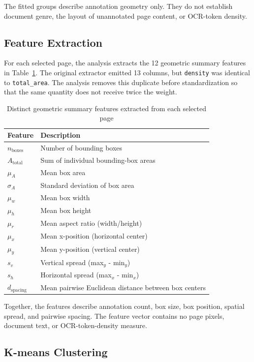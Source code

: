 The fitted groups describe annotation geometry only. They do not establish
document genre, the layout of unannotated page content, or OCR-token density.

\subsection{Feature Extraction}
\label{subsec:features}

For each selected page, the analysis extracts the 12 geometric summary
features in Table~\ref{tab:features}. The original extractor emitted 13
columns, but \texttt{density} was identical to \texttt{total\_area}. The
analysis removes this duplicate before standardization so that the same
quantity does not receive twice the weight.

\begin{table}[h]
\centering
\caption{Distinct geometric summary features extracted from each selected page}
\label{tab:features}
\begin{tabular}{@{}ll@{}}
\toprule
\textbf{Feature} & \textbf{Description} \\ \midrule
$n_{\text{boxes}}$ & Number of bounding boxes \\
$A_{\text{total}}$ & Sum of individual bounding-box areas \\
$\mu_A$ & Mean box area \\
$\sigma_A$ & Standard deviation of box area \\
$\mu_w$ & Mean box width \\
$\mu_h$ & Mean box height \\
$\mu_r$ & Mean aspect ratio (width/height) \\
$\mu_x$ & Mean x-position (horizontal center) \\
$\mu_y$ & Mean y-position (vertical center) \\
$s_v$ & Vertical spread (max$_y$ - min$_y$) \\
$s_h$ & Horizontal spread (max$_x$ - min$_x$) \\
$d_{\text{spacing}}$ & Mean pairwise Euclidean distance between box centers \\ \bottomrule
\end{tabular}
\end{table}

Together, the features describe annotation count, box size, box position,
spatial spread, and pairwise spacing. The feature vector contains no page
pixels, document text, or OCR-token-density measure.

\subsection{K-means Clustering}
\label{subsec:kmeans}

